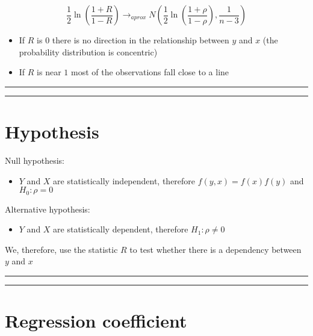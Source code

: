 \documentclass[
]{book}
\providecommand{\tightlist}{%
  \setlength{\itemsep}{0pt}\setlength{\parskip}{0pt}}
\begin{document}
\[\frac{1}{2}\ln (\frac{1+R}{1-R}) \rightarrow_{aprox} N(\frac{1}{2}\ln (\frac{1+\rho}{1-\rho}), \frac{1}{n-3})\]

\begin{itemize}
\item
  If \(R\) is \(0\) there is no direction in the relationship between \(y\) and \(x\) (the probability distribution is concentric)
\item
  If \(R\) is near \(1\) most of the observations fall close to a line
\end{itemize}

\begin{center}\rule{0.5\linewidth}{0.5pt}\end{center}

\begin{center}\rule{0.5\linewidth}{0.5pt}\end{center}

\hypertarget{hypothesis-5}{%
\section{Hypothesis}\label{hypothesis-5}}

Null hypothesis:

\begin{itemize}
\tightlist
\item
  \(Y\) and \(X\) are statistically independent, therefore \(f(y,x)=f(x)f(y)\) and \(H_0: \rho=0\)
\end{itemize}

Alternative hypothesis:

\begin{itemize}
\tightlist
\item
  \(Y\) and \(X\) are statistically dependent, therefore \(H_1: \rho \neq 0\)
\end{itemize}

We, therefore, use the statistic \(R\) to test whether there is a dependency between \(y\) and \(x\)

\begin{center}\rule{0.5\linewidth}{0.5pt}\end{center}

\begin{center}\rule{0.5\linewidth}{0.5pt}\end{center}

\hypertarget{regression-coefficient}{%
\section{Regression coefficient}\label{regression-coefficient}}
\end{document}
